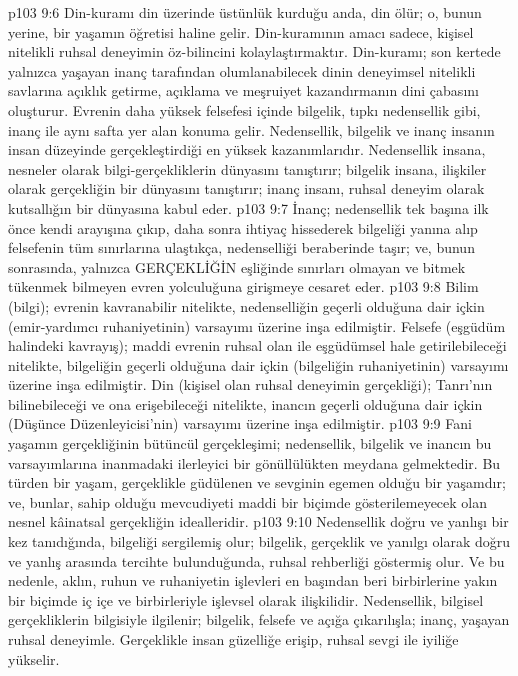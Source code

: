 \vs p103 9:6 Din\hyp{}kuramı din üzerinde üstünlük kurduğu anda, din ölür; o, bunun yerine, bir yaşamın öğretisi haline gelir. Din\hyp{}kuramının amacı sadece, kişisel nitelikli ruhsal deneyimin öz\hyp{}bilincini kolaylaştırmaktır. Din\hyp{}kuramı; son kertede yalnızca yaşayan inanç tarafından olumlanabilecek dinin deneyimsel nitelikli savlarına açıklık getirme, açıklama ve meşruiyet kazandırmanın dini çabasını oluşturur. Evrenin daha yüksek felsefesi içinde bilgelik, tıpkı nedensellik gibi, inanç ile aynı safta yer alan konuma gelir. Nedensellik, bilgelik ve inanç insanın insan düzeyinde gerçekleştirdiği en yüksek kazanımlarıdır. Nedensellik insana, nesneler olarak bilgi\hyp{}gerçekliklerin dünyasını tanıştırır; bilgelik insana, ilişkiler olarak gerçekliğin bir dünyasını tanıştırır; inanç insanı, ruhsal deneyim olarak kutsallığın bir dünyasına kabul eder.
\vs p103 9:7 İnanç; nedensellik tek başına ilk önce kendi arayışına çıkıp, daha sonra ihtiyaç hissederek bilgeliği yanına alıp felsefenin tüm sınırlarına ulaştıkça, nedenselliği beraberinde taşır; ve, bunun sonrasında, yalnızca GERÇEKLİĞİN eşliğinde sınırları olmayan ve bitmek tükenmek bilmeyen evren yolculuğuna girişmeye cesaret eder.
\vs p103 9:8 Bilim (bilgi); evrenin kavranabilir nitelikte, nedenselliğin geçerli olduğuna dair içkin (emir\hyp{}yardımcı ruhaniyetinin) varsayımı üzerine inşa edilmiştir. Felsefe (eşgüdüm halindeki kavrayış); maddi evrenin ruhsal olan ile eşgüdümsel hale getirilebileceği nitelikte, bilgeliğin geçerli olduğuna dair içkin (bilgeliğin ruhaniyetinin) varsayımı üzerine inşa edilmiştir. Din (kişisel olan ruhsal deneyimin gerçekliği); Tanrı’nın bilinebileceği ve ona erişebileceği nitelikte, inancın geçerli olduğuna dair içkin (Düşünce Düzenleyicisi’nin) varsayımı üzerine inşa edilmiştir.
\vs p103 9:9 Fani yaşamın gerçekliğinin bütüncül gerçekleşimi; nedensellik, bilgelik ve inancın bu varsayımlarına inanmadaki ilerleyici bir gönüllülükten meydana gelmektedir. Bu türden bir yaşam, gerçeklikle güdülenen ve sevginin egemen olduğu bir yaşamdır; ve, bunlar, sahip olduğu mevcudiyeti maddi bir biçimde gösterilemeyecek olan nesnel kâinatsal gerçekliğin idealleridir.
\vs p103 9:10 Nedensellik doğru ve yanlışı bir kez tanıdığında, bilgeliği sergilemiş olur; bilgelik, gerçeklik ve yanılgı olarak doğru ve yanlış arasında tercihte bulunduğunda, ruhsal rehberliği göstermiş olur. Ve bu nedenle, aklın, ruhun ve ruhaniyetin işlevleri en başından beri birbirlerine yakın bir biçimde iç içe ve birbirleriyle işlevsel olarak ilişkilidir. Nedensellik, bilgisel gerçekliklerin bilgisiyle ilgilenir; bilgelik, felsefe ve açığa çıkarılışla; inanç, yaşayan ruhsal deneyimle. Gerçeklikle insan güzelliğe erişip, ruhsal sevgi ile iyiliğe yükselir.
